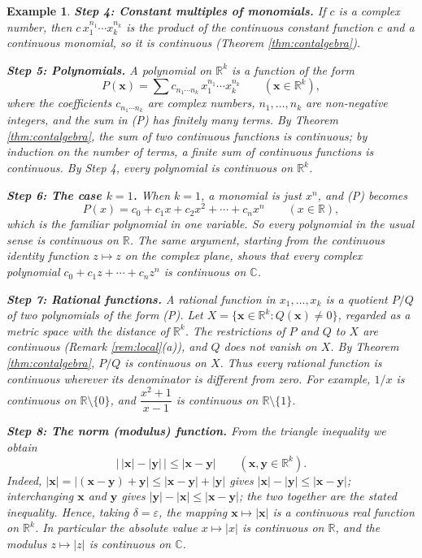 \documentclass{article}
\theoremstyle{mythm}
\newtheorem{example}[theorem]{Example}
\begin{document}
\begin{example}
\textbf{Step 4: Constant multiples of monomials.} If $c$ is a complex number, then $c \, x_1^{n_1} \cdots x_k^{n_k}$ is the product of the continuous constant function $c$ and a continuous monomial, so it is continuous (Theorem \ref{thm:contalgebra}).

\textbf{Step 5: Polynomials.} A \textit{polynomial} on $\mathbb{R}^k$ is a function of the form
\[
P(\mathbf{x}) = \sum c_{n_1 \cdots n_k} \, x_1^{n_1} \cdots x_k^{n_k} \qquad (\mathbf{x} \in \mathbb{R}^k), \tag{P}
\]
where the coefficients $c_{n_1 \cdots n_k}$ are complex numbers, $n_1, \dots, n_k$ are non-negative integers, and the sum in (P) has \textit{finitely many} terms. By Theorem \ref{thm:contalgebra}, the sum of two continuous functions is continuous; by induction on the number of terms, a finite sum of continuous functions is continuous. By Step 4, every polynomial is continuous on $\mathbb{R}^k$.

\textbf{Step 6: The case $k = 1$.} When $k = 1$, a monomial is just $x^n$, and (P) becomes
\[
P(x) = c_0 + c_1 x + c_2 x^2 + \cdots + c_n x^n \qquad (x \in \mathbb{R}),
\]
which is the familiar polynomial in one variable. So every polynomial in the usual sense is continuous on $\mathbb{R}$. The same argument, starting from the continuous identity function $z \mapsto z$ on the complex plane, shows that every complex polynomial $c_0 + c_1 z + \cdots + c_n z^n$ is continuous on $\mathbb{C}$.

\textbf{Step 7: Rational functions.} A \textit{rational function} in $x_1, \dots, x_k$ is a quotient $P/Q$ of two polynomials of the form (P). Let $X = \{\mathbf{x} \in \mathbb{R}^k : Q(\mathbf{x}) \neq 0\}$, regarded as a metric space with the distance of $\mathbb{R}^k$. The restrictions of $P$ and $Q$ to $X$ are continuous (Remark \ref{rem:local}(a)), and $Q$ does not vanish on $X$. By Theorem \ref{thm:contalgebra}, $P/Q$ is continuous on $X$. Thus \textit{every rational function is continuous wherever its denominator is different from zero}. For example, $1/x$ is continuous on $\mathbb{R} \setminus \{0\}$, and $\dfrac{x^2 + 1}{x - 1}$ is continuous on $\mathbb{R} \setminus \{1\}$.

\textbf{Step 8: The norm (modulus) function.} From the triangle inequality we obtain
\[
\big|\, |\mathbf{x}| - |\mathbf{y}| \,\big| \leq |\mathbf{x} - \mathbf{y}| \qquad (\mathbf{x}, \mathbf{y} \in \mathbb{R}^k).
\]
Indeed, $|\mathbf{x}| = |(\mathbf{x} - \mathbf{y}) + \mathbf{y}| \leq |\mathbf{x} - \mathbf{y}| + |\mathbf{y}|$ gives $|\mathbf{x}| - |\mathbf{y}| \leq |\mathbf{x} - \mathbf{y}|$; interchanging $\mathbf{x}$ and $\mathbf{y}$ gives $|\mathbf{y}| - |\mathbf{x}| \leq |\mathbf{x} - \mathbf{y}|$; the two together are the stated inequality. Hence, taking $\delta = \varepsilon$, the mapping $\mathbf{x} \mapsto |\mathbf{x}|$ is a continuous real function on $\mathbb{R}^k$. In particular the absolute value $x \mapsto |x|$ is continuous on $\mathbb{R}$, and the modulus $z \mapsto |z|$ is continuous on $\mathbb{C}$.


\end{example}
\end{document}
